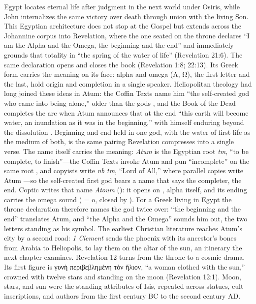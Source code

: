 Egypt locates eternal life after judgment in the next world under Osiris, while John internalizes the same victory over death through union with the living Son.
This Egyptian architecture does not stop at the Gospel but extends across the Johannine corpus into Revelation, where the one seated on the throne declares ``I am the Alpha and the Omega, the beginning and the end'' and immediately grounds that totality in ``the spring of the water of life'' (Revelation 21:6).
The same declaration opens and closes the book (Revelation 1:8; 22:13).
Its Greek form carries the meaning on its face: alpha and omega (Α, Ω), the first letter and the last, hold origin and completion in a single speaker.
Heliopolitan theology had long joined these ideas in Atum: the Coffin Texts name him ``the self-created god who came into being alone,'' older than the gods \cite[Spell 75]{coffintexts}, and the Book of the Dead completes the arc when Atum announces that at the end ``this earth will become water, an inundation as it was in the beginning,'' with himself enduring beyond the dissolution \cite[Spell 175]{bookofthedead}.
Beginning and end held in one god, with the water of first life as the medium of both, is the same pairing Revelation compresses into a single verse.
The name itself carries the meaning: \emph{Atum} is the Egyptian root \emph{tm}, ``to be complete, to finish''---the Coffin Texts invoke Atum and pun ``incomplete'' on the same root \cite[Spell 141]{coffintexts}, and copyists write \emph{nb tm}, ``Lord of All,'' where parallel copies write Atum \cite[Spell 7]{coffintexts}---so the self-created first god bears a name that says the completer, the end.
Coptic writes that name \emph{Atoum} (): it opens on , alpha itself, and its  ending carries the omega sound ( = ō, closed by ).
For a Greek living in Egypt the throne declaration therefore names the god twice over: ``the beginning and the end'' translates Atum, and ``the Alpha and the Omega'' sounds him out, the two letters standing as his symbol.
The earliest Christian literature reaches Atum's city by a second road: \emph{1 Clement} sends the phoenix with its ancestor's bones from Arabia to Heliopolis, to lay them on the altar of the sun, an itinerary the next chapter examines.
Revelation 12 turns from the throne to a cosmic drama.
Its first figure is γυνὴ περιβεβλημένη τὸν ἥλιον, ``a woman clothed with the sun,'' crowned with twelve stars and standing on the moon (Revelation 12:1).
Moon, stars, and sun were the standing attributes of Isis, repeated across statues, cult inscriptions, and authors from the first century BC to the second century AD.
